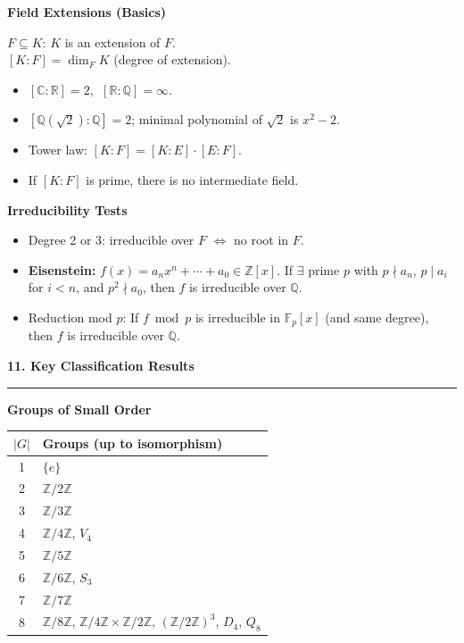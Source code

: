 \documentclass[10pt,twocolumn]{article}
\newcommand{\sect}[1]{\medskip\noindent\textbf{\large #1}\medskip\hrule\smallskip}
\newcommand{\subsect}[1]{\smallskip\noindent\textbf{#1}\par}
\begin{document}
\subsect{Field Extensions (Basics)}
$F\subseteq K$: $K$ is an extension of $F$.\\
$[K:F]=\dim_F K$ (degree of extension).
\begin{itemize}[nosep,leftmargin=*]
\item $[\mathbb{C}:\mathbb{R}]=2$, $\;[\mathbb{R}:\mathbb{Q}]=\infty$.
\item $[\mathbb{Q}(\sqrt{2}):\mathbb{Q}]=2$; minimal polynomial of $\sqrt{2}$ is $x^2-2$.
\item Tower law: $[K:F]=[K:E]\cdot[E:F]$.
\item If $[K:F]$ is prime, there is no intermediate field.
\end{itemize}

\subsect{Irreducibility Tests}
\begin{itemize}[nosep,leftmargin=*]
\item Degree 2 or 3: irreducible over $F$ $\iff$ no root in $F$.
\item \textbf{Eisenstein:} $f(x)=a_nx^n+\cdots+a_0\in\mathbb{Z}[x]$. If $\exists$ prime $p$ with $p\nmid a_n$, $p\mid a_i$ for $i<n$, and $p^2\nmid a_0$, then $f$ is irreducible over $\mathbb{Q}$.
\item Reduction mod $p$: If $f\bmod p$ is irreducible in $\mathbb{F}_p[x]$ (and same degree), then $f$ is irreducible over $\mathbb{Q}$.
\end{itemize}

\sect{11. Key Classification Results}

\subsect{Groups of Small Order}
\begin{tabular}{@{}cl@{}}
\toprule
$|G|$ & Groups (up to isomorphism) \\
\midrule
1 & $\{e\}$ \\
2 & $\mathbb{Z}/2\mathbb{Z}$ \\
3 & $\mathbb{Z}/3\mathbb{Z}$ \\
4 & $\mathbb{Z}/4\mathbb{Z}$, \;$V_4$ \\
5 & $\mathbb{Z}/5\mathbb{Z}$ \\
6 & $\mathbb{Z}/6\mathbb{Z}$, \;$S_3$ \\
7 & $\mathbb{Z}/7\mathbb{Z}$ \\
8 & $\mathbb{Z}/8\mathbb{Z}$, \;$\mathbb{Z}/4\mathbb{Z}\times\mathbb{Z}/2\mathbb{Z}$, \;$(\mathbb{Z}/2\mathbb{Z})^3$, \;$D_4$, \;$Q_8$ \\
\bottomrule
\end{tabular}
\end{document}
